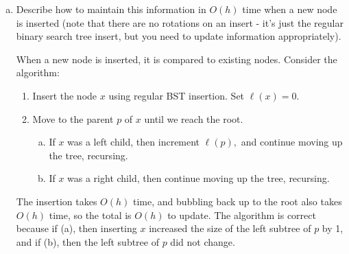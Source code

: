 \documentclass{article}
\begin{document}
\begin{enumerate}[(a)]
	\item Describe how to maintain this information in $O(h)$ time when a new node is inserted (note that there are no rotations on an insert - it's just the regular binary search tree insert, but you need to update information appropriately).
		\begin{soln}
			When a new node is inserted, it is compared to existing nodes. Consider the algorithm:
			\begin{enumerate}[(1)]
				\item Insert the node $x$ using regular BST insertion. Set $\ell(x)=0.$
				\item Move to the parent $p$ of $x$ until we reach the root.
					\begin{enumerate}[(a)]
						\item If $x$ was a left child, then increment $\ell(p),$ and continue moving up the tree, recursing.
						\item If $x$ was a right child, then continue moving up the tree, recursing.
					\end{enumerate}
			\end{enumerate}

			The insertion takes $O(h)$ time, and bubbling back up to the root also takes $O(h)$ time, so the total is $O(h)$ to update. The algorithm is correct because if (a), then inserting $x$ increased the size of the left subtree of $p$ by 1, and if (b), then the left subtree of $p$ did not change.
		\end{soln}
		
\end{enumerate}
\end{document}
